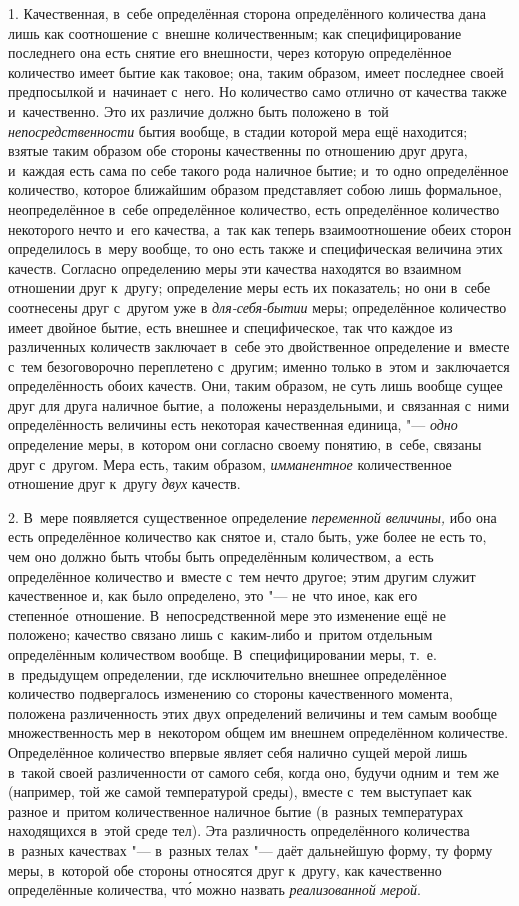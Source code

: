 1. Качественная, в~себе определённая сторона определённого количества дана лишь
как соотношение с~внешне количественным; как специфицирование последнего она
есть снятие его внешности, через которую определённое количество имеет бытие
как таковое; она, таким образом, имеет последнее своей предпосылкой и~начинает
с~него. Но количество само отлично от качества также и~качественно. Это их
различие должно быть положено в~той {\em непосредственности} бытия вообще, в
стадии которой мера ещё находится; взятые таким образом обе стороны качественны
по отношению друг друга, и~каждая есть сама по себе такого рода наличное бытие;
и~то одно определённое количество, которое ближайшим образом представляет собою
лишь формальное, неопределённое в~себе определённое количество, есть
определённое количество некоторого нечто и~его качества, а~так как теперь
взаимоотношение обеих сторон определилось в~меру вообще, то оно есть также и
специфическая величина этих качеств. Согласно определению меры эти качества
находятся во взаимном отношении друг к~другу; определение меры есть их
показатель; но они в~себе соотнесены друг с~другом уже в {\em для-себя-бытии}
меры; определённое количество имеет двойное бытие, есть внешнее и
специфическое, так что каждое из различенных количеств заключает в~себе это
двойственное определение и~вместе с~тем безоговорочно переплетено с~другим;
именно только в~этом и~заключается определённость обоих качеств. Они, таким
образом, не суть лишь вообще сущее друг для друга наличное бытие, а~положены
нераздельными, и~связанная с~ними определённость величины есть некоторая
качественная единица, "--- {\em одно} определение меры, в~котором они согласно
своему понятию, в~себе, связаны друг с~другом. Мера есть, таким образом,
{\em имманентное} количественное отношение друг к~другу {\em двух} качеств.

2. В~мере появляется существенное определение {\em переменной величины,} ибо
она есть определённое количество как снятое и, стало быть, уже более не есть
то, чем оно должно быть чтобы быть определённым количеством, а~есть
определённое количество и~вместе с~тем нечто другое; этим другим служит
качественное и, как было определено, это "--- не~что иное, как его
степенн\'{о}е~отношение. В~непосредственной мере это изменение ещё не положено;
качество связано лишь с~каким-либо и~притом отдельным определённым количеством
вообще. В~специфицировании меры, т.~е. в~предыдущем определении, где
исключительно внешнее определённое количество подвергалось изменению со стороны
качественного момента, положена различенность этих двух определений величины и
тем самым вообще множественность мер в~некотором общем им внешнем определённом
количестве. Определённое количество впервые являет себя налично сущей мерой
лишь в~такой своей различенности от самого себя, когда оно, будучи одним и~тем
же (например, той же самой температурой среды), вместе с~тем выступает как
разное и~притом количественное наличное бытие (в~разных температурах
находящихся в~этой среде тел). Эта различность определённого количества
в~разных качествах "--- в~разных телах "--- даёт дальнейшую форму, ту форму
меры, в~которой обе стороны относятся друг к~другу, как качественно
определённые количества, чт\'{о} можно назвать {\em реализованной мерой}.

